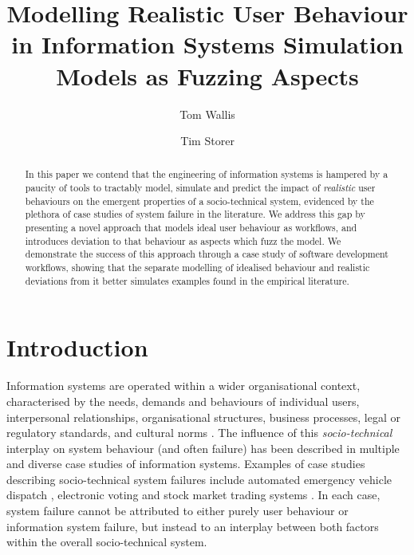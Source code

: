 \documentclass{llncs}
\title{Modelling Realistic User Behaviour in Information Systems Simulation Models as Fuzzing Aspects}
\author{Tom Wallis\orcidID{} \and Tim Storer\orcidID{}}
\institute{University of Glasgow, Glasgow, Scotland,\\
  \email{w.wallis.1@research.gla.ac.uk},\\
  \email{timothy.storer@glasgow.ac.uk},
}
\begin{document}

\maketitle


\begin{abstract}
  In this paper we contend that the engineering of information systems is hampered by a paucity of tools to tractably
  model, simulate and predict the impact of \emph{realistic} user behaviours on the emergent properties of
  a socio-technical system, evidenced by the plethora of case studies of system failure in the literature.  We
  address this gap by presenting a novel approach that models ideal user behaviour as workflows, and introduces
  deviation to that behaviour as aspects which fuzz the model. We demonstrate the success of this approach through a
  case study of software development workflows,  showing that the separate modelling of idealised behaviour and 
  realistic deviations from it better simulates examples found in the empirical literature.
\end{abstract}


\section{Introduction}
\label{sec:introduction}


Information systems are operated within a wider organisational context, characterised by the needs, demands and
behaviours of individual users, interpersonal relationships, organisational structures, business processes, legal or
regulatory standards, and cultural norms \citep{bade07structures,pentland05organisational}.  The
influence of this \emph{socio-technical} interplay on system behaviour (and often failure) has been described in
multiple and diverse case studies of information systems.  Examples of case studies describing socio-technical system
failures include automated emergency vehicle dispatch \citep{robinson96limited}, electronic voting
\citep{lock07observations} and stock market trading systems \citep{cftc-sec10findings}. In each case, system failure
cannot be attributed to either purely user behaviour or information system failure, but instead to an interplay between
both factors within the overall socio-technical system.
\end{document}
